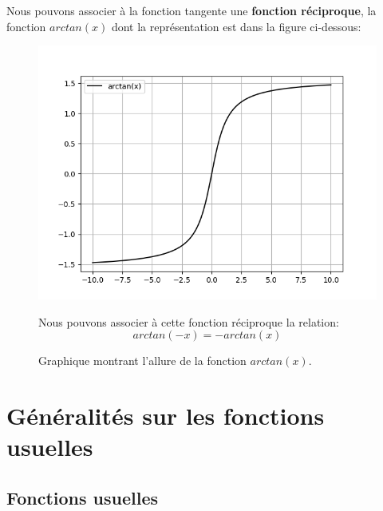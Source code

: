 \documentclass[12pt,a4paper,openany]{book}
\begin{document}
Nous pouvons associer à la fonction tangente une \textbf{fonction réciproque}, la fonction \textbf{$ arctan(x) $} dont la représentation est dans la figure ci-dessous:
\begin{figure}[!h]
\begin{center}
\includegraphics[scale=0.8]{Images/grapheArctan.png} 
\caption{Graphique montrant l'allure de la fonction $ arctan(x) $.}
\label{grapheArctan}
\end{center}

Nous pouvons associer à cette fonction réciproque la relation:
\begin{equation}
arctan(-x) = -arctan(x)
\end{equation}
\end{figure}

\chapter{Généralités sur les fonctions usuelles}

\section{Fonctions usuelles}
\end{document}
